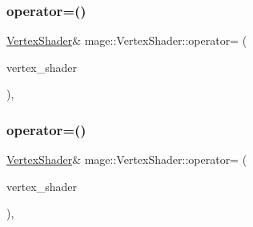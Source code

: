 \hypertarget{classmage_1_1_vertex_shader_a0094f5c2adb8377fa5c8d52e7a65136f}{}\label{classmage_1_1_vertex_shader_a0094f5c2adb8377fa5c8d52e7a65136f} 
\subsubsection{\texorpdfstring{operator=()}{operator=()}\hspace{0.1cm}{\footnotesize\ttfamily [1/2]}}
{\footnotesize\ttfamily \hyperlink{classmage_1_1_vertex_shader}{Vertex\+Shader}\& mage\+::\+Vertex\+Shader\+::operator= (\begin{DoxyParamCaption}\item[{const \hyperlink{classmage_1_1_vertex_shader}{Vertex\+Shader} \&}]{vertex\+\_\+shader }\end{DoxyParamCaption})\hspace{0.3cm}{\ttfamily [private]}, {\ttfamily [delete]}}

\hypertarget{classmage_1_1_vertex_shader_ada6250a89610e5649e0062c9a50fb78a}{}\label{classmage_1_1_vertex_shader_ada6250a89610e5649e0062c9a50fb78a} 
\subsubsection{\texorpdfstring{operator=()}{operator=()}\hspace{0.1cm}{\footnotesize\ttfamily [2/2]}}
{\footnotesize\ttfamily \hyperlink{classmage_1_1_vertex_shader}{Vertex\+Shader}\& mage\+::\+Vertex\+Shader\+::operator= (\begin{DoxyParamCaption}\item[{\hyperlink{classmage_1_1_vertex_shader}{Vertex\+Shader} \&\&}]{vertex\+\_\+shader }\end{DoxyParamCaption})\hspace{0.3cm}{\ttfamily [private]}, {\ttfamily [delete]}}

\hypertarget{classmage_1_1_vertex_shader_a095834b90967611e69205e9e82f4a536}{}\label{classmage_1_1_vertex_shader_a095834b90967611e69205e9e82f4a536} 
